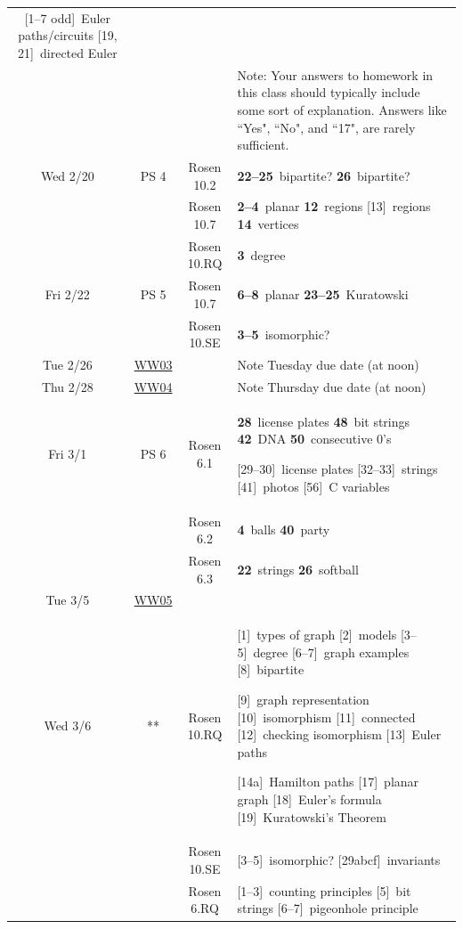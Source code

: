 \documentclass{scrartcl}
\def\WW#1{\href{https://mathwebwork.cs.calvin.edu/webwork2/Math252-S19-Pruim/WW#1}{WW#1}}
\def\hwn#1{\relax}
\def\hwn#1{\ {\tiny (#1)}}
\def\hwn#1{$_{\mbox{\ \tiny #1}}$}
\def\hwn#1{~{\tiny #1}}
\newcommand{\extra}[2][\relax]{[#2]\hwn{#1}}
\newcommand{\mand}[2][\relax]{{\bf \large #2}\hwn{#1}}
\begin{document}
\begin{center}
\begin{longtable}{|c|c|c|p{4.3in}|}
	 \extra[Euler paths/circuits]{1--7 odd}
	 \extra[directed Euler]{19, 21}
	 \\
	 &&& Note: Your answers to homework in this class
	 should typically include some sort of explanation.
	 Answers like ``Yes", ``No", and ``17", are rarely sufficient.
	 \\
	 \hline
	 Wed 2/20 & PS 4 & Rosen 10.2 &
	 \mand[bipartite?]{22--25}
	 \mand[bipartite?]{26}
	 \\
	 & & Rosen 10.7 &
	 \mand[planar]{2--4}
	 \mand[regions]{12}
	 \extra[regions]{13}
	 \mand[vertices]{14}
	 \\
	 & & Rosen 10.RQ &
	 \mand[degree]{3}
	 \\
	 \hline
	 Fri 2/22 & PS 5 & Rosen 10.7 &
	 \mand[planar]{6--8}
	 \mand[Kuratowski]{23--25}
	 \\
	 && Rosen 10.SE &
	 \mand[isomorphic?]{3--5}
	 \\
	 \hline
	 Tue 2/26 & \WW{03} & & Note Tuesday due date (at noon)
	 \\
	 \hline
	 Thu 2/28 & \WW{04} & & Note Thursday due date (at noon)
	 \\
	 \hline
	 \newpage
	  Fri 3/1 & PS 6 & Rosen 6.1 &
    \mand[license plates]{28}
	  \mand[bit strings]{48}
	  \mand[DNA]{42}
	  \mand[consecutive 0's]{50}  %

   \extra[license plates]{29--30}
   \extra[strings]{32--33}
   \extra[photos]{41}
   \extra[C variables]{56}
  \\
  & & Rosen 6.2 &
    \mand[balls]{4}
    \mand[party]{40}
  \\
  & & Rosen 6.3 &
    \mand[strings]{22}
    \mand[softball]{26}
 \\
 \hline
 Tue 3/5 & \WW{05} & & \\
 \hline
 Wed 3/6 & ** & Rosen 10.RQ &
   \extra[types of graph]{1}
	 \extra[models]{2}
	 \extra[degree]{3--5}
	 \extra[graph examples]{6--7}
	 \extra[bipartite]{8}

	 \extra[graph representation]{9}
	 \extra[isomorphism]{10}
	 \extra[connected]{11}
	 \extra[checking isomorphism]{12}
	 \extra[Euler paths]{13}

	 \extra[Hamilton paths]{14a}
	 \extra[planar graph]{17}
	 \extra[Euler's formula]{18}
	 \extra[Kuratowski's Theorem]{19}
	 \\
	 & & Rosen 10.SE &
	 \extra[isomorphic?]{3--5}
	 \extra[invariants]{29abcf}
 \\
  & & Rosen 6.RQ &
	 \extra[counting principles]{1--3}
	 \extra[bit strings]{5}
	 \extra[pigeonhole principle]{6--7}


\end{longtable}
\end{center}
\end{document}
